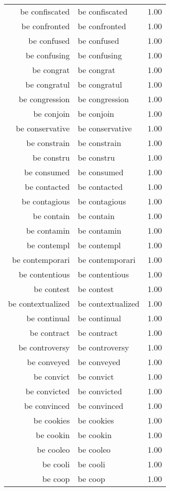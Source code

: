 \begin{table}[ht]
\begin{tabular}{rlr}
  be confiscated & be confiscated & 1.00 \\ 
  be confronted & be confronted & 1.00 \\ 
  be confused & be confused & 1.00 \\ 
  be confusing & be confusing & 1.00 \\ 
  be congrat & be congrat & 1.00 \\ 
  be congratul & be congratul & 1.00 \\ 
  be congression & be congression & 1.00 \\ 
  be conjoin & be conjoin & 1.00 \\ 
  be conservative & be conservative & 1.00 \\ 
  be constrain & be constrain & 1.00 \\ 
  be constru & be constru & 1.00 \\ 
  be consumed & be consumed & 1.00 \\ 
  be contacted & be contacted & 1.00 \\ 
  be contagious & be contagious & 1.00 \\ 
  be contain & be contain & 1.00 \\ 
  be contamin & be contamin & 1.00 \\ 
  be contempl & be contempl & 1.00 \\ 
  be contemporari & be contemporari & 1.00 \\ 
  be contentious & be contentious & 1.00 \\ 
  be contest & be contest & 1.00 \\ 
  be contextualized & be contextualized & 1.00 \\ 
  be continual & be continual & 1.00 \\ 
  be contract & be contract & 1.00 \\ 
  be controversy & be controversy & 1.00 \\ 
  be conveyed & be conveyed & 1.00 \\ 
  be convict & be convict & 1.00 \\ 
  be convicted & be convicted & 1.00 \\ 
  be convinced & be convinced & 1.00 \\ 
  be cookies & be cookies & 1.00 \\ 
  be cookin & be cookin & 1.00 \\ 
  be cooleo & be cooleo & 1.00 \\ 
  be cooli & be cooli & 1.00 \\ 
  be coop & be coop & 1.00 \\ 

\end{tabular}
\end{table}
